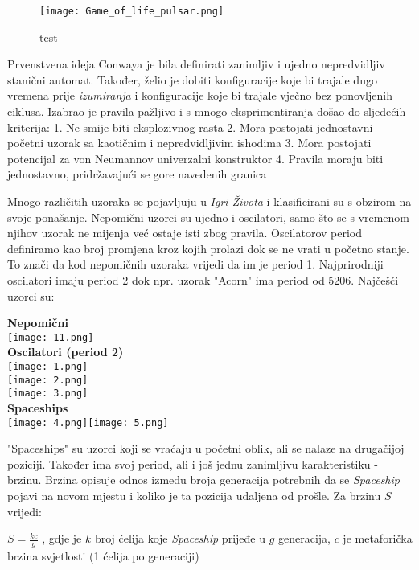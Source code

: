 \documentclass[11pt]{article}
\makeatletter
\def\maxwidth{\ifdim\Gin@nat@width>\linewidth\linewidth
    \else\Gin@nat@width\fi}
\let\Oldincludegraphics\includegraphics
\renewcommand{\includegraphics}[1]{\Oldincludegraphics[width=.8\maxwidth]{#1}}
\makeatother
\begin{document}
\begin{figure}
\centering
\texttt{[image: Game\_of\_life\_pulsar.png]}
\caption{test}
\end{figure}

    Prvenstvena ideja Conwaya je bila definirati zanimljiv i ujedno
nepredvidljiv stanični automat. Također, želio je dobiti konfiguracije
koje bi trajale dugo vremena prije \emph{izumiranja} i konfiguracije
koje bi trajale vječno bez ponovljenih ciklusa. Izabrao je pravila
pažljivo i s mnogo eksprimentiranja došao do sljedećih kriterija: 1. Ne
smije biti eksplozivnog rasta 2. Mora postojati jednostavni početni
uzorak sa kaotičnim i nepredvidljivim ishodima 3. Mora postojati
potencijal za von Neumannov univerzalni konstruktor 4. Pravila moraju
biti jednostavno, pridržavajući se gore navedenih granica

    Mnogo različitih uzoraka se pojavljuju u \emph{Igri Života} i
klasificirani su s obzirom na svoje ponašanje. Nepomični uzorci su
ujedno i oscilatori, samo što se s vremenom njihov uzorak ne mijenja već
ostaje isti zbog pravila. Oscilatorov period definiramo kao broj
promjena kroz kojih prolazi dok se ne vrati u početno stanje. To znači
da kod nepomičnih uzoraka vrijedi da im je period 1. Najprirodniji
oscilatori imaju period 2 dok npr. uzorak "Acorn" ima period od 5206.
Najčešći uzorci su:


\begin{center}
\textbf{Nepomični} 
\\[0.2cm]
\texttt{[image: 11.png]} 
\\
\textbf{Oscilatori (period
2)}
\\
\texttt{[image: 1.png]}
\\
\texttt{[image: 2.png]}
\\
\texttt{[image: 3.png]}
\\
\textbf{Spaceships} 
\\
\texttt{[image: 4.png]}\texttt{[image: 5.png]}
\end{center}

"Spaceships" su uzorci koji se vraćaju u početni oblik, ali se nalaze na
drugačijoj poziciji. Također ima svoj period, ali i još jednu zanimljivu
karakteristiku - brzinu. Brzina opisuje odnos između broja generacija
potrebnih da se \emph{Spaceship} pojavi na novom mjestu i koliko je ta
pozicija udaljena od prošle. Za brzinu $S$ vrijedi:

$S = \frac{kc}{g}$ , gdje je $k$ broj ćelija koje \emph{Spaceship}
prijeđe u $g$ generacija, $c$ je metaforička brzina svjetlosti (1 ćelija po
generaciji)
\end{document}
